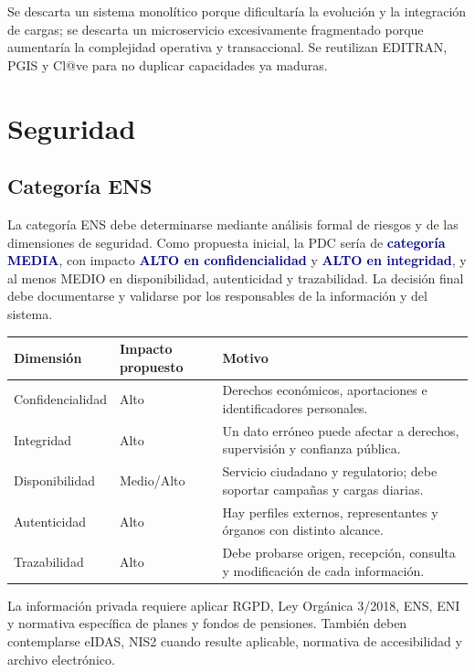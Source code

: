 \documentclass[11pt,a4paper]{article}
\newcommand{\key}[1]{\textbf{\textcolor{navy}{#1}}}
\begin{document}
Se descarta un sistema monolítico porque dificultaría la evolución y la integración de cargas; se descarta un microservicio excesivamente fragmentado porque aumentaría la complejidad operativa y transaccional. Se reutilizan EDITRAN, PGIS y Cl@ve para no duplicar capacidades ya maduras.

\section{Seguridad}

\subsection{Categoría ENS}

La categoría ENS debe determinarse mediante análisis formal de riesgos y de las dimensiones de seguridad. Como propuesta inicial, la PDC sería de \key{categoría MEDIA}, con impacto \key{ALTO en confidencialidad} y \key{ALTO en integridad}, y al menos MEDIO en disponibilidad, autenticidad y trazabilidad. La decisión final debe documentarse y validarse por los responsables de la información y del sistema.

\begin{center}
\begin{tabularx}{0.95\textwidth}{l l Y}\toprule
\textbf{Dimensión} & \textbf{Impacto propuesto} & \textbf{Motivo}\\\midrule
Confidencialidad & Alto & Derechos económicos, aportaciones e identificadores personales.\\
Integridad & Alto & Un dato erróneo puede afectar a derechos, supervisión y confianza pública.\\
Disponibilidad & Medio/Alto & Servicio ciudadano y regulatorio; debe soportar campañas y cargas diarias.\\
Autenticidad & Alto & Hay perfiles externos, representantes y órganos con distinto alcance.\\
Trazabilidad & Alto & Debe probarse origen, recepción, consulta y modificación de cada información.\\\bottomrule
\end{tabularx}\end{center}

La información privada requiere aplicar RGPD, Ley Orgánica 3/2018, ENS, ENI y normativa específica de planes y fondos de pensiones. También deben contemplarse eIDAS, NIS2 cuando resulte aplicable, normativa de accesibilidad y archivo electrónico.
\end{document}
